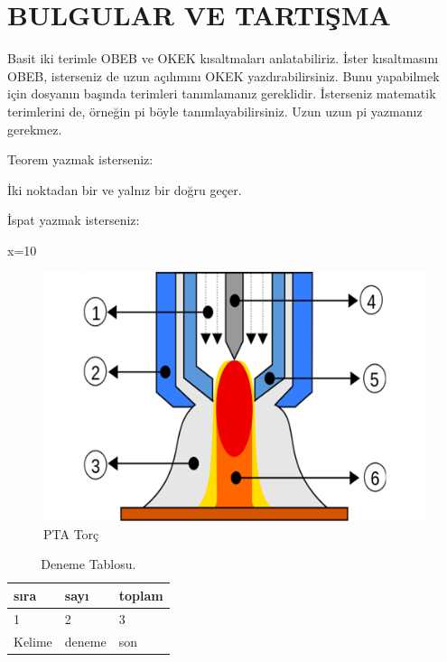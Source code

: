 \chapter{BULGULAR VE TARTIŞMA}

Basit iki terimle \acrfull{OBEB} ve \acrfull{OKEK} kısaltmaları anlatabiliriz. İster kısaltmasını \acrshort{OBEB}, isterseniz de uzun açılımını \acrlong{OKEK} yazdırabilirsiniz. Bunu yapabilmek için dosyanın başında terimleri tanımlamanız gereklidir. İsterseniz matematik terimlerini de, örneğin \acrshort{pi} böyle tanımlayabilirsiniz. Uzun uzun \acrfull{pi} yazmanız gerekmez. 

Teorem yazmak isterseniz:
\begin{theorem}[Öklid]
 İki noktadan bir ve yalnız bir doğru geçer.
\end{theorem}

İspat yazmak isterseniz:
\begin{ispat}
x=10
\end{ispat}
\lipsum[1-2]
\begin{figure}[h]
\centering
\includegraphics[width=\textwidth]{gorseller/ptaTorc}
\caption{PTA Torç}\label{fig:PtaTorc1}
\end{figure}
\lipsum[1-2]
\begin{table}
\centering
\caption{Deneme Tablosu.}\label{tab:den1}
\begin{tabular}{|l|l|l|}
\hline
sıra   & sayı   & toplam \\ \hline
1      & 2      & 3      \\ \hline
Kelime & deneme & son    \\ \hline
\end{tabular}
\end{table}


